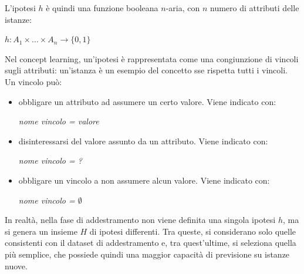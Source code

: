 L'ipotesi $h$ è quindi una funzione booleana $n$-aria, con $n$ numero di
attributi delle istanze: 
\begin{center}
    $h: A_1 \times \ldots \times A_n \rightarrow \{ 0, 1 \}$
\end{center}
Nel concept learning, un'ipotesi è rappresentata come una congiunzione di
vincoli sugli attributi: un'istanza è un esempio del concetto sse rispetta
tutti i vincoli.
Un vincolo può:
\begin{itemize}
    \item obbligare un attributo ad assumere un certo valore. Viene indicato
    con:
    \begin{center}
        \textit{nome vincolo = valore}
    \end{center}
    \item disinteressarsi del valore assunto da un attributo. Viene indicato
    con:
    \begin{center}
        \textit{nome vincolo = ?}
    \end{center} 
    \item obbligare un vincolo a non assumere alcun valore. Viene indicato con:
    \begin{center}
        \textit{nome vincolo = $\emptyset$}
    \end{center}
\end{itemize}
In realtà, nella fase di addestramento non viene definita una singola ipotesi
$h$, ma si genera un insieme $H$ di ipotesi differenti.
Tra queste, si considerano solo quelle consistenti con il dataset di
addestramento e, tra quest'ultime, si seleziona quella più semplice, che
possiede quindi una maggior capacità di previsione su istanze nuove.

